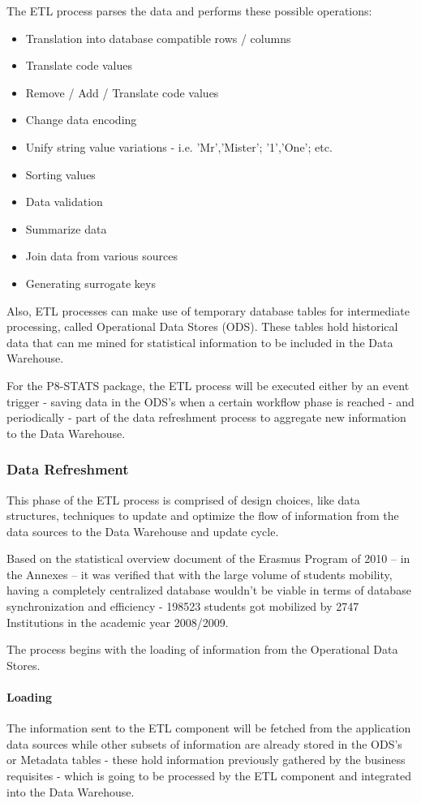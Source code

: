 The ETL process parses the data and performs these possible
operations\cite{wiki:etl}:
\begin{itemize}
  \item Translation into database compatible rows / columns
  \item Translate code values
  \item Remove / Add / Translate code values
  \item Change data encoding
  \item Unify string value variations - i.e. 'Mr','Mister'; '1','One'; etc.
  \item Sorting values
  \item Data validation
  \item Summarize data
  \item Join data from various sources
  \item Generating surrogate keys
\end{itemize}

Also, ETL processes can make use of temporary database tables for intermediate
processing, called Operational Data Stores (ODS). These tables hold historical
data that can me mined for statistical information to be included in the Data
Warehouse.

For the P8-STATS package, the ETL process will be executed either by an event
trigger - saving data in the ODS’s when a certain workflow phase is reached -
and periodically - part of the data refreshment process to aggregate new
information to the Data Warehouse.

\subsubsection{Data Refreshment}
This phase of the ETL process is comprised of design choices, like data
structures, techniques to update and optimize the flow of information from the
data sources to the Data Warehouse and update cycle.

Based on the statistical overview document of the Erasmus Program of 2010 – in
the Annexes – it was verified that with the large volume of students mobility,
having a completely centralized database wouldn't be viable in terms of database
synchronization and efficiency - 198523 students got mobilized by 2747
Institutions in the academic year 2008/2009.

The process begins with the loading of information from the Operational Data
Stores.

\paragraph{Loading}
The information sent to the ETL component will be fetched from the application
data sources while other subsets of information are already stored in the ODS’s
or Metadata tables - these hold information previously gathered by the business
requisites - which is going to be processed by the ETL component and integrated
into the Data Warehouse.

